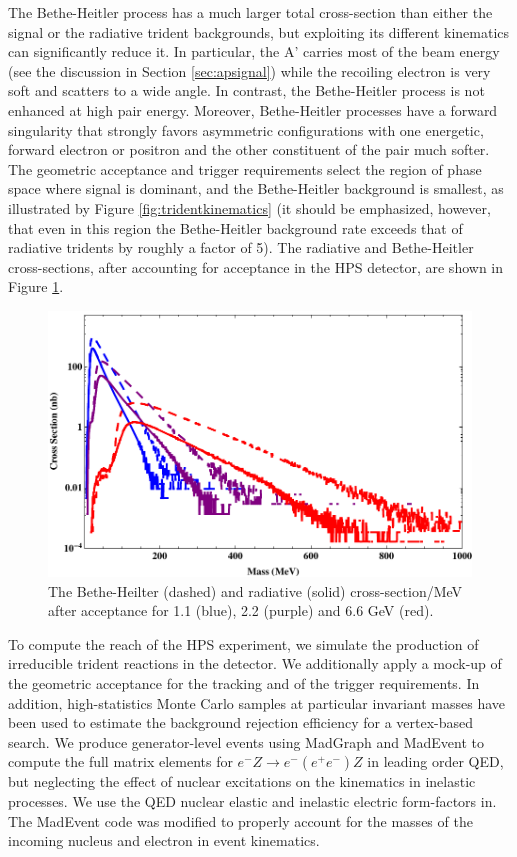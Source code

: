 The Bethe-Heitler process has a much larger total cross-section than either the signal 
or the radiative trident backgrounds, but exploiting its different kinematics can 
significantly reduce it. In particular, the A' carries most of the beam energy 
(see the discussion in Section \ref{sec:apsignal}) while the recoiling electron is very soft and 
scatters to a wide angle. In contrast, the Bethe-Heitler process is not enhanced at 
high pair energy. Moreover, Bethe-Heitler processes have a forward singularity that 
strongly favors asymmetric configurations with one energetic, forward electron or 
positron and the other constituent of the pair much softer.   The geometric acceptance and trigger 
requirements select the region of phase space where signal is dominant, and the 
Bethe-Heitler background is smallest, as illustrated by Figure \ref{fig:tridentkinematics} (it should be 
emphasized, however, that even in this region the Bethe-Heitler background rate exceeds 
that of radiative tridents by roughly a factor of 5).  The radiative and Bethe-Heitler  cross-sections, after accounting for acceptance
in the HPS detector, are shown in Figure \ref{fig:bkgXS}.

\begin{figure}
\includegraphics[scale=1]{reach/HPS-CrossSections.pdf}
\caption{The Bethe-Heilter (dashed) and radiative (solid) cross-section/MeV after acceptance for 1.1 (blue), 2.2 (purple) and 6.6 GeV (red).}
\label{fig:bkgXS}
\end{figure} 

To compute the reach of the HPS experiment, we simulate the production of irreducible 
trident reactions in the detector. We additionally apply a mock-up of the geometric 
acceptance for the tracking and of the trigger requirements.  In addition, high-statistics 
Monte Carlo samples at particular invariant masses have been used to estimate 
the background rejection efficiency for a vertex-based search.  
We produce generator-level events using MadGraph and MadEvent \cite{Alwall:2007st}  to compute the full 
matrix elements for $e^-Z \rightarrow e^- (e^+ e^-)Z$ in leading order QED, but 
neglecting the effect of nuclear excitations on the kinematics in inelastic processes. 
We use the QED nuclear elastic and inelastic electric form-factors in\cite{Kim:1973he}. The MadEvent 
code was modified to properly account for the masses of the incoming nucleus and electron 
in event kinematics.

